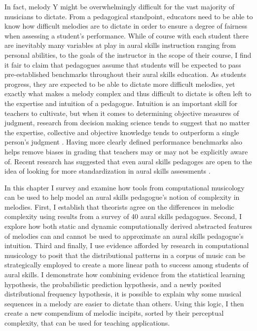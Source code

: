 \documentclass[]{book}
\begin{document}
In fact, melody Y might be overwhelmingly difficult for the vast majority of musicians to dictate.
From a pedagogical standpoint, educators need to be able to know how difficult melodies are to dictate in order to ensure a degree of fairness when assessing a student's performance.
While of course with each student there are inevitably many variables at play in aural skills instruction ranging from personal abilities, to the goals of the instructor in the scope of their course, I find it fair to claim that pedagogues assume that students will be expected to pass pre-established benchmarks throughout their aural skills education.
As students progress, they are expected to be able to dictate more difficult melodies, yet exactly what makes a melody complex and thus difficult to dictate is often left to the expertise and intuition of a pedagogue.
Intuition is an important skill for teachers to cultivate, but when it comes to determining objective measures of judgment, research from decision making science tends to suggest that no matter the expertise, collective and objective knowledge tends to outperform a single person's judgment \citep{kahnemanThinkingFastSlow2012, loggAlgorithmAppreciationPeople2019, meehlClinicalStatisticalPrediction1954}.
Having more clearly defined performance benchmarks also helps remove biases in grading that teachers may or may not be explicitly aware of.
Recent research has suggested that even aural skills pedagoges are open to the idea of looking for more standardization in aural skills assessments \citep{paneyTeachingMelodicDictation2014}.

In this chapter I survey and examine how tools from computational musicology can be used to help model an aural skills pedagogue's notion of complexity in melodies.
First, I establish that theorists agree on the differences in melodic complexity using results from a survey of 40 aural skills pedagogues.
Second, I explore how both static and dynamic computationally derived abstracted features of melodies can and cannot be used to approximate an aural skills pedagogue's intuition.
Third and finally, I use evidence afforded by research in computational musicology to posit that the distributional patterns in a corpus of music can be strategically employed to create a more linear path to success among students of aural skills.
I demonstrate how combining evidence from the statistical learning hypothesis, the probabilistic prediction hypothesis, and a newly posited distributional frequency hypothesis, it is possible to explain why some musical sequences in a melody are easier to dictate than others.
Using this logic, I then create a new compendium of melodic incipits, sorted by their perceptual complexity, that can be used for teaching applications.
\end{document}
